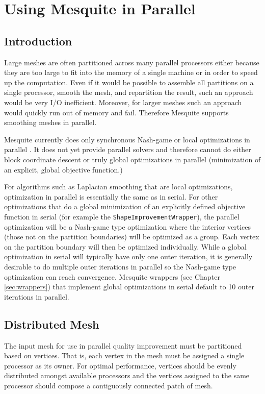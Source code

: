 \chapter{Using Mesquite in Parallel}
\label{sec:parallel}

\section{Introduction}

Large meshes are often partitioned across many parallel processors either because they are too large to fit into the memory of a single machine or in order to speed up the computation. Even if it would be possible to assemble all partitions on a single processor, smooth the mesh, and repartition the result, such an approach would be very I/O inefficient. Moreover, for larger meshes such an approach would quickly run out of memory and fail. Therefore Mesquite supports smoothing meshes in parallel.

Mesquite currently does only synchronous Nash-game or local optimizations in parallel \cite{Fr95}.  It does not yet provide parallel solvers and therefore cannot do either block coordinate descent or truly global optimizations in parallel (minimization of an explicit, global objective function.)  

For algorithms such as Laplacian smoothing that are local optimizations, optimization in parallel is essentially the same as in serial.  For other optimizations that do a global minimization of an explicitly defined objective function in serial (for example the \texttt{ShapeImprovementWrapper}), the parallel optimization will be a Nash-game type optimization where the interior vertices (those not on the partition boundaries) will be optimized as a group.  Each vertex on the partition boundary will then be optimized individually.  While a global optimization in serial will typically have only one outer iteration, it is generally desirable to do multiple outer iterations in parallel so the Nash-game type optimization can reach convergence.  Mesquite wrappers (see Chapter \ref{sec:wrappers}) that implement global optimizations in serial default to 10 outer iterations in parallel.


\section{Distributed Mesh}

The input mesh for use in parallel quality improvement must be partitioned based on vertices.  That is, each vertex in the mesh must be assigned a single processor as its owner.  For optimal performance, vertices should be evenly distributed amongst available processors and the vertices assigned to the same processor should compose a contiguously connected patch of mesh.  

